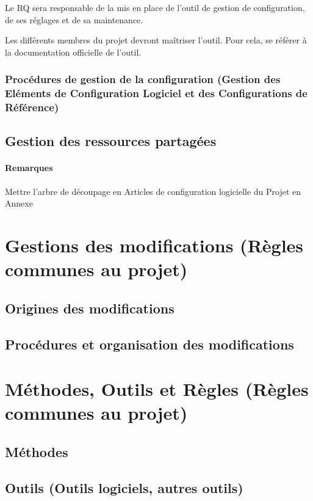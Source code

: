 \documentclass[a4paper]{article}
\begin{document}
Le RQ sera responsable de la mis en place de l'outil de gestion de configuration, de ses réglages et de sa maintenance.

Les différents membres du projet devront maîtriser l'outil. Pour cela, se référer à la documentation officielle de l'outil.

\subsubsection{Procédures de gestion de la configuration (Gestion des Eléments de Configuration Logiciel et des Configurations de Référence)}

\subsection{Gestion des ressources partagées}

\paragraph{Remarques}

Mettre l'arbre de découpage en Articles de configuration logicielle du Projet en Annexe

\section{Gestions des modifications (Règles communes au projet)}

\subsection{Origines des modifications}

\subsection{Procédures et organisation des modifications}

\section{Méthodes, Outils et Règles (Règles communes au projet)}

\subsection{Méthodes}

\subsection{Outils (Outils logiciels, autres outils)}
\end{document}
